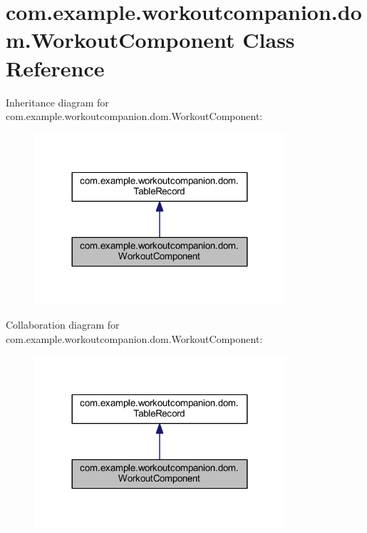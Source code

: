 \hypertarget{classcom_1_1example_1_1workoutcompanion_1_1dom_1_1_workout_component}{\section{com.\-example.\-workoutcompanion.\-dom.\-Workout\-Component Class Reference}
\label{classcom_1_1example_1_1workoutcompanion_1_1dom_1_1_workout_component}
}


Inheritance diagram for com.\-example.\-workoutcompanion.\-dom.\-Workout\-Component\-:
\nopagebreak
\begin{figure}[H]
\begin{center}
\leavevmode
\includegraphics[width=264pt]{classcom_1_1example_1_1workoutcompanion_1_1dom_1_1_workout_component__inherit__graph}
\end{center}
\end{figure}


Collaboration diagram for com.\-example.\-workoutcompanion.\-dom.\-Workout\-Component\-:
\nopagebreak
\begin{figure}[H]
\begin{center}
\leavevmode
\includegraphics[width=264pt]{classcom_1_1example_1_1workoutcompanion_1_1dom_1_1_workout_component__coll__graph}
\end{center}
\end{figure}
